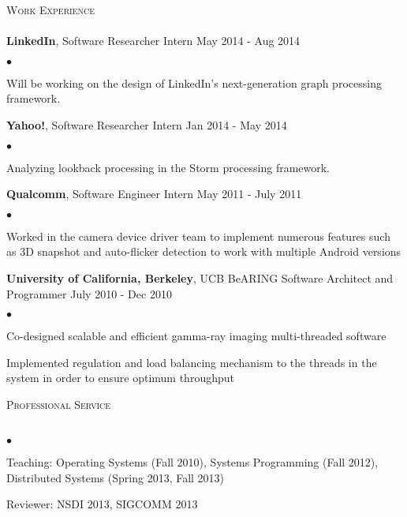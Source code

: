 \documentclass{article}
\newcommand{\lineunder}{\vspace*{-8pt} \\ \hspace*{-18pt} \hrulefill \\}
\newcommand{\header}[1]{{\hspace*{-15pt}\vspace*{6pt} \textsc{#1}} \vspace*{-6pt} \lineunder}
\newcommand{\employer}[3]{{ \textbf{#1}, #2 \hfill{#3}\\ }}
\newenvironment{achievements}{\begin{list}{$\bullet$}{\topsep 0pt \itemsep -2pt}}{\vspace*{4pt}\end{list}}
\begin{document}
\header{Work Experience}
\employer{LinkedIn}{Software Researcher Intern}{May 2014 - Aug 2014}
    \begin{achievements}
    \item Will be working on the design of LinkedIn's next-generation graph processing framework.
    \end{achievements}

\employer{Yahoo!}{Software Researcher Intern}{Jan 2014 - May 2014}
    \begin{achievements}
    \item Analyzing lookback processing in the Storm processing framework.
    \end{achievements}

\employer{Qualcomm}{Software Engineer Intern}{May 2011 - July 2011}
    \begin{achievements}
    \item Worked in the camera device driver team to implement numerous features such as 3D snapshot and auto-flicker detection to work with multiple Android versions
    \end{achievements}

\employer{University of California, Berkeley}{UCB BeARING	Software Architect and Programmer}{July 2010 - Dec 2010}
    \begin{achievements}
    \item Co-designed scalable and efficient gamma-ray imaging multi-threaded software
    \item Implemented regulation and load balancing mechanism to the threads in the system in order to ensure optimum throughput
    \end{achievements}

\header{Professional Service}
    \begin{achievements}
    \item Teaching: Operating Systems (Fall 2010), Systems Programming (Fall 2012), Distributed Systems (Spring 2013, Fall 2013)
    \item Reviewer: NSDI 2013, SIGCOMM 2013
    \end{achievements}

\end{document}

